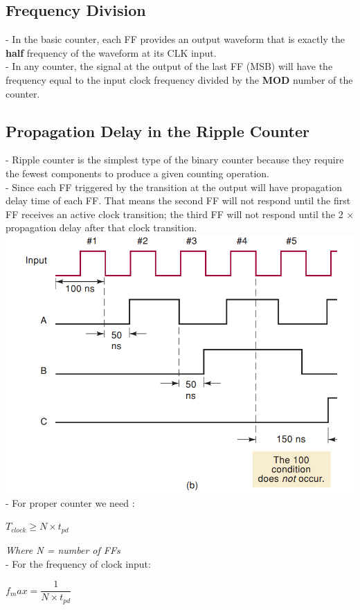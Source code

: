 \documentclass[12pt]{article}
\begin{document}
\subsection{Frequency Division}
- In the basic counter, each FF provides an output waveform that is exactly the \textbf{half} frequency of the waveform at its CLK input. \\
- In any counter, the signal at the output of the last FF (MSB) will have the frequency equal to the input clock frequency divided by the \textbf{MOD} number of the counter. \\
\subsection{Propagation Delay in the Ripple Counter}
- Ripple counter is the simplest type of the binary counter because they require the fewest components to produce a given counting operation. \\
- Since each FF triggered by the transition at the output will have propagation delay time of each FF. That means the second FF will not respond until the first FF receives an active clock transition; the third FF will not respond until the 2 $\times$ propagation delay after that clock transition. \\
\includegraphics[scale = 0.6]{hinh40}
\bigbreak
- For proper counter we need :
\begin{mybox}
	\begin{center}
		$T_{clock} \ge N \times t_{pd}$
	\end{center}
\end{mybox}
\textit{Where N = number of FFs} \\
\bigbreak
- For the frequency of clock input:
\begin{mybox}
	\begin{center}
		$f_max = \dfrac{1}{N \times t_{pd}}$
	\end{center}
\end{mybox}
\end{document}
